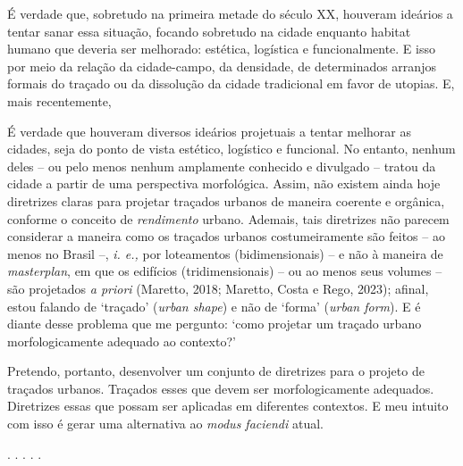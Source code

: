 \documentclass[]{report}
\begin{document}
	É verdade que, sobretudo na primeira metade do século XX, houveram ideários a tentar sanar essa situação, focando sobretudo na cidade enquanto habitat humano que deveria ser melhorado: estética, logística e funcionalmente. E isso por meio da relação da cidade-campo, da densidade, de determinados arranjos formais do traçado ou da dissolução da cidade tradicional em favor de utopias. E, mais recentemente,

	É verdade que houveram diversos ideários projetuais a tentar melhorar as cidades, seja do ponto de vista estético, logístico e funcional. No entanto, nenhum deles – ou pelo menos nenhum amplamente conhecido e divulgado – tratou da cidade a partir de uma perspectiva morfológica. Assim, não existem ainda hoje diretrizes claras para projetar traçados urbanos de maneira coerente e orgânica, conforme o conceito de \textit{rendimento} urbano. %
	Ademais, tais diretrizes não parecem considerar a maneira como os traçados urbanos costumeiramente são feitos – ao menos no Brasil –, \textit{i. e.,} por loteamentos (bidimensionais) – e não à maneira de \textit{masterplan}, em que os edifícios (tridimensionais) – ou ao menos seus volumes – são projetados \textit{a priori} (Maretto, 2018; Maretto, Costa e Rego, 2023); afinal, estou falando de `traçado' (\textit{urban shape}) e não de `forma' (\textit{urban form}). E é diante desse problema que me pergunto: `como projetar um traçado urbano morfologicamente adequado ao contexto?'

	Pretendo, portanto, desenvolver um conjunto de diretrizes para o projeto de traçados urbanos. Traçados esses que devem ser morfologicamente adequados. Diretrizes essas que possam ser aplicadas em diferentes contextos. E meu intuito com isso é gerar uma alternativa ao \textit{modus faciendi} atual. 
	
	\begin{center}
		. . . . .
	\end{center}
\end{document}
